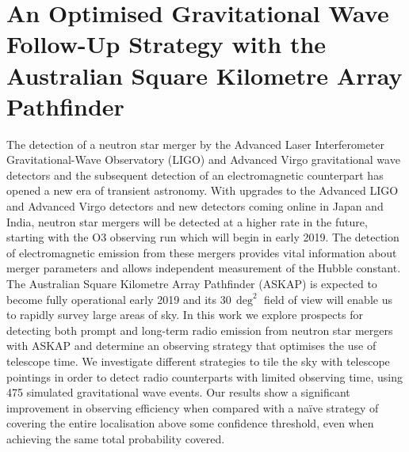 \chapter{An Optimised Gravitational Wave Follow-Up Strategy with the Australian Square Kilometre Array Pathfinder}
\label{chap:optimised_followup}

\begingroup



\endgroup

The detection of a neutron star merger by the Advanced Laser Interferometer Gravitational-Wave Observatory (LIGO) and Advanced Virgo gravitational wave detectors and the subsequent detection of an electromagnetic counterpart has opened a new era of transient astronomy. With upgrades to the Advanced LIGO and Advanced Virgo detectors and new detectors coming online in Japan and India, neutron star mergers will be detected at a higher rate in the future, starting with the O3 observing run which will begin in early 2019. The detection of electromagnetic emission from these mergers provides vital information about merger parameters and allows independent measurement of the Hubble constant. The Australian Square Kilometre Array Pathfinder (ASKAP) is expected to become fully operational early 2019 and its 30\,$\deg^2$ field of view will enable us to rapidly survey large areas of sky. In this work we explore prospects for detecting both prompt and long-term radio emission from neutron star mergers with ASKAP and determine an observing strategy that optimises the use of telescope time. We investigate different strategies to tile the sky with telescope pointings in order to detect radio counterparts with limited observing time, using 475 simulated gravitational wave events. Our results show a significant improvement in observing efficiency when compared with a na\"ive strategy of covering the entire localisation above some confidence threshold, even when achieving the same total probability covered.


